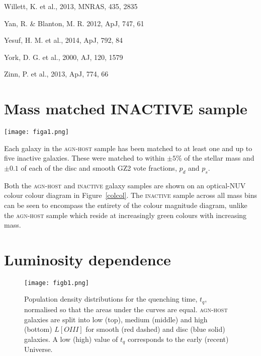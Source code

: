 \documentclass[useAMS,usenatbib]{mn2e}
\def\changedbds    {\color{ncc} }
\def\secondchange    {\color{srv} }
\begin{document}
\begin{thebibliography}{}
 Willett, K. et al., 2013, MNRAS, 435, 2835

 Yan, R. \& Blanton, M. R. 2012, ApJ, 747, 61

 Yesuf, H. M. et al., 2014, ApJ, 792, 84

 York, D. G. et al., 2000, AJ, 120, 1579

 Zinn, P. et al., 2013, ApJ, 774, 66

\end{thebibliography}{}

\appendix

\section{Mass matched INACTIVE sample}

\begin{figure*}
\texttt{[image: figa1.png]}
\caption{Optical-NUV colour-colour contour diagrams for the \textsc{agn-host} (top) and \textsc{inactive} galaxy samples split into low (blue), medium (green) and high (red) stellar mass samples. Underlaying each diagram are the contours of the \textsc{gz2-galex} sample (grey).}
\label{colcol}
\end{figure*}

Each galaxy in the \textsc{agn-host} sample has been matched to at least one and up to five inactive galaxies. These were matched to within $\pm5\%$ of the stellar mass and $\pm 0.1$ of each of the disc and smooth GZ2 vote fractions, $p_d$ and $p_s$.

Both the \textsc{agn-host} and \textsc{inactive} galaxy samples are shown on an optical-NUV colour colour diagram in Figure~\ref{colcol}. The \textsc{inactive} sample across all mass bins can be seen to encompass the entirety of the colour magnitude diagram, unlike the \textsc{agn-host} sample which reside at increasingly green colours with increasing mass. 


\section{Luminosity dependence}

\begin{figure}
\texttt{[image: figb1.png]}
\caption{{\secondchange Population density} distributions for the quenching time, $t_q$, {\changedbds normalised so that the areas under the curves are equal}. \textsc{agn-host} galaxies are split into low (top), medium (middle) and high (bottom)  $L[OIII]$ for smooth (red dashed) and disc (blue solid) galaxies. A low (high) value of $t_q$ corresponds to the early (recent) Universe.}
\label{loiiitime}
\end{figure}
\end{document}
